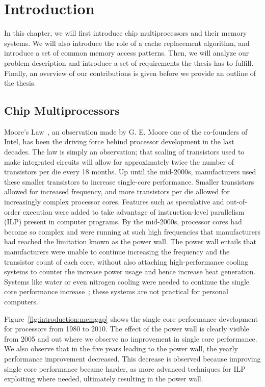 \chapter{Introduction}
\label{cpt:introduction}

In this chapter, we will first introduce chip multiprocessors and their memory systems.
We will also introduce the role of a cache replacement algorithm, and introduce a set of common memory access patterns.
Then, we will analyze our problem description and introduce a set of requirements the thesis has to fulfill.
Finally, an overview of our contributions is given before we provide an outline of the thesis.

\section{Chip Multiprocessors}

Moore's Law~\cite{Moore1998}, an observation made by G. E. Moore one of the co-founders of Intel, has been the driving force behind processor development in the last decades.
The law is simply an observation; that scaling of transistors used to make integrated circuits will allow for approximately twice the number of transistors per die every 18 months.
Up until the mid-2000s, manufacturers used these smaller transistors to increase single-core performance.
Smaller transistors allowed for increased frequency, and more transistors per die allowed for increasingly complex processor cores.
Features such as speculative and out-of-order execution were added to take advantage of instruction-level parallelism (ILP) present in computer programs.
By the mid-2000s, processor cores had become so complex and were running at such high frequencies that manufacturers had reached the limitation known as the power wall.
The power wall entails that manufacturers were unable to continue increasing the frequency and the transistor count of each core, without also attaching high-performance cooling systems to counter the increase power usage and hence increase heat generation.
Systems like water or even nitrogen cooling were needed to continue the single core performance increase~\cite{Sutter2005}; these systems are not practical for personal computers.

Figure~\ref{fig:introduction:memgap} shows the single core performance development for processors from 1980 to 2010.
The effect of the power wall is clearly visible from 2005 and out where we observe no improvement in single core performance.
We also observe that in the five years leading to the power wall, the yearly performance improvement decreased.
This decrease is observed because improving single core performance became harder, as more advanced techniques for ILP exploiting where needed, ultimately resulting in the power wall.

